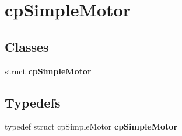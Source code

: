 \hypertarget{group__cp_simple_motor}{\section{cp\-Simple\-Motor}
\label{group__cp_simple_motor}
}
\subsection*{Classes}
\begin{DoxyCompactItemize}
\item 
struct {\bfseries cp\-Simple\-Motor}
\end{DoxyCompactItemize}
\subsection*{Typedefs}
\begin{DoxyCompactItemize}
\item 
\hypertarget{group__cp_simple_motor_ga26c99c004b9a33271bd1b0582b78e3de}{typedef struct cp\-Simple\-Motor {\bfseries cp\-Simple\-Motor}}\label{group__cp_simple_motor_ga26c99c004b9a33271bd1b0582b78e3de}

\end{DoxyCompactItemize}
